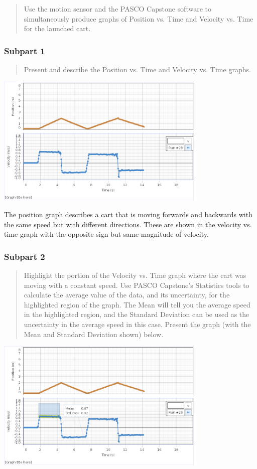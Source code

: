 \documentclass[8pt]{extarticle}
\begin{document}
{\begin{quote}
	Use the motion sensor and the PASCO Capstone software to simultaneously produce graphs of Position vs. Time and Velocity vs. Time for the launched cart.
\end{quote}
\subsubsection*{Subpart 1}
\begin{quote}
	Present and describe the Position vs. Time and Velocity vs. Time graphs.
\end{quote}
\begin{center}
	\includegraphics[width=10cm]{Lab2Image2_1_1}
\end{center}
The position graph describes a cart that is moving forwards and backwards with the same speed but with different directions. These are shown in the velocity vs. time graph with the opposite sign but same magnitude of velocity.
\subsubsection*{Subpart 2}
\begin{quote}
	Highlight the portion of the Velocity vs. Time graph where the cart was moving with a constant speed. Use PASCO Capstone’s Statistics tools to calculate the average value of the data, and its uncertainty, for the highlighted region of the graph.  The Mean will tell you the average speed in the highlighted region, and the Standard Deviation can be used as the uncertainty in the average speed in this case.  Present the graph (with the Mean and Standard Deviation shown) below. 
\end{quote}
\begin{center}
	\includegraphics[width=10cm]{Lab2Image2_1_2}
\end{center}
}
\end{document}

